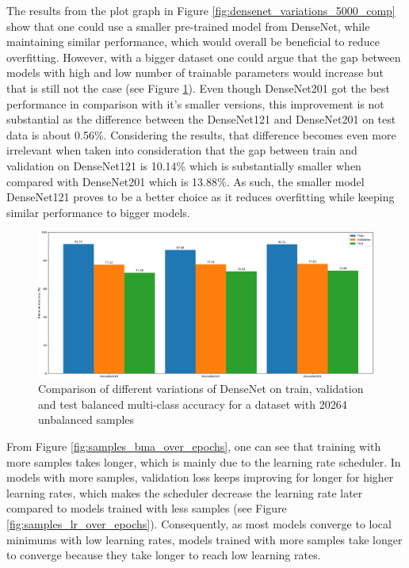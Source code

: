     The results from the plot graph in Figure \ref{fig:densenet_variations_5000_comp} show that one could use a  smaller pre-trained model from DenseNet, while maintaining similar performance, which would overall be beneficial to reduce overfitting. However, with a bigger dataset one could argue that the gap between models with high and low number of trainable parameters would increase but that is still not the case (see Figure \ref{fig:densenet_variations_20264_comp}). Even though DenseNet201 got the best performance in comparison with it's smaller versions, this improvement is not substantial as the difference between the DenseNet121 and DenseNet201 on test data is about 0.56\%. Considering the results, that difference becomes even more irrelevant when taken into consideration that the gap between train and validation on DenseNet121 is 10.14\% which is substantially smaller when compared with  DenseNet201 which is 13.88\%. As such, the smaller model DenseNet121 proves to be a better choice as it reduces overfitting while keeping similar performance to bigger models. \par
    
    \begin{figure}[ht]
        \centering
        \includegraphics[width=\textwidth]{figs/densenet_variations_20264_comp.pdf}
        \caption{Comparison of different variations of DenseNet on train, validation and test balanced multi-class accuracy for a dataset with 20264 unbalanced samples}
        \label{fig:densenet_variations_20264_comp}
    \end{figure}
    
    From Figure \ref{fig:samples_bma_over_epochs}, one can see that training with more samples takes longer, which is mainly due to the learning rate scheduler. In models with more samples, validation loss keeps improving for longer for higher learning rates, which makes the scheduler decrease the learning rate later compared to models trained with less samples (see Figure \ref{fig:samples_lr_over_epochs}). Consequently, as most models converge to local minimums with low learning rates, models trained with more samples take longer to converge because they take longer to reach low learning rates. \par
    

